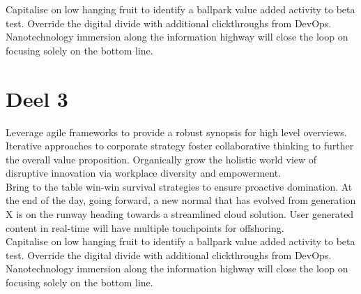 Capitalise on low hanging fruit to identify a ballpark value added activity to beta test. Override the digital divide with additional clickthroughs from DevOps. Nanotechnology immersion along the information highway will close the loop on focusing solely on the bottom line. 

\section{Deel 3}

Leverage agile frameworks to provide a robust synopsis for high level overviews. Iterative approaches to corporate strategy foster collaborative thinking to further the overall value proposition. Organically grow the holistic world view of disruptive innovation via workplace diversity and empowerment.\\

Bring to the table win-win survival strategies to ensure proactive domination. At the end of the day, going forward, a new normal that has evolved from generation X is on the runway heading towards a streamlined cloud solution. User generated content in real-time will have multiple touchpoints for offshoring. \\

Capitalise on low hanging fruit to identify a ballpark value added activity to beta test. Override the digital divide with additional clickthroughs from DevOps. Nanotechnology immersion along the information highway will close the loop on focusing solely on the bottom line. 